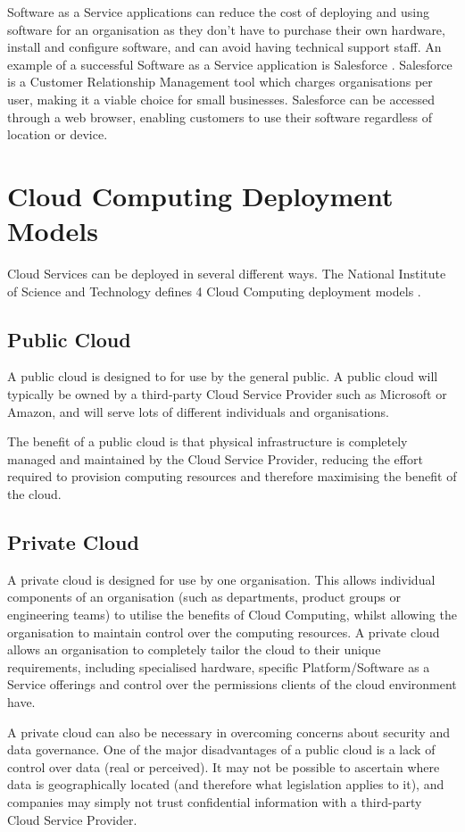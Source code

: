 Software as a Service applications can reduce the cost of deploying and using software for an organisation as they don't have to purchase their own hardware, install and configure software, and can avoid having technical support staff. An example of a successful Software as a Service application is Salesforce \cite{salesforce}. Salesforce is a Customer Relationship Management tool which charges organisations per user, making it a viable choice for small businesses. Salesforce can be accessed through a web browser, enabling customers to use their software regardless of location or device. 

\section{Cloud Computing Deployment Models}
Cloud Services can be deployed in several different ways. The National Institute of Science and Technology defines 4 Cloud Computing deployment models \cite{mell2011nist}.

\subsection{Public Cloud}
A public cloud is designed to for use by the general public. A public cloud will typically be owned by a third-party Cloud Service Provider such as Microsoft or Amazon, and will serve lots of different individuals and organisations. 

The benefit of a public cloud is that physical infrastructure is completely managed and maintained by the Cloud Service Provider, reducing the effort required to provision computing resources and therefore maximising the benefit of the cloud.

\subsection{Private Cloud}
A private cloud is designed for use by one organisation. This allows individual components of an organisation (such as departments, product groups or engineering teams) to utilise the benefits of Cloud Computing, whilst allowing the organisation to maintain control over the computing resources. A private cloud allows an organisation to completely tailor the cloud to their unique requirements, including specialised hardware, specific Platform/Software as a Service offerings and control over the permissions clients of the cloud environment have.

A private cloud can also be necessary in overcoming concerns about security and data governance. One of the major disadvantages of a public cloud is a lack of control over data (real or perceived). It may not be possible to ascertain where data is geographically located (and therefore what legislation applies to it), and companies may simply not trust confidential information with a third-party Cloud Service Provider.

